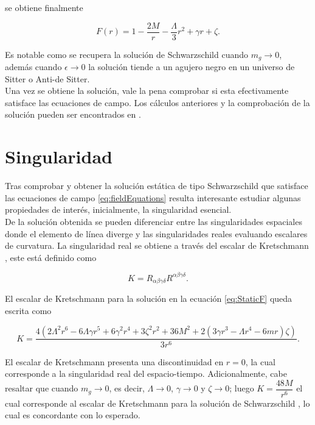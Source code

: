 se obtiene finalmente

\begin{equation}
    F(r)=1-\dfrac{2M}{r}-\dfrac{\Lambda}{3}r^2+\gamma r+\zeta.
    \label{eq:StaticF}
\end{equation}

Es notable como se recupera la solución de Schwarzschild cuando $m_g\rightarrow 0$, además cuando $\epsilon\rightarrow 0$ la solución tiende a un agujero negro en un universo de Sitter o Anti-de Sitter.\\

Una vez se obtiene la solución, vale la pena comprobar si esta efectivamente satisface las ecuaciones de campo. Los cálculos anteriores y la comprobación de la solución pueden ser encontrados en \cite{GitHub}.

\section{Singularidad}
Tras comprobar y obtener la solución estática de tipo Schwarzschild que satisface las ecuaciones de campo \eqref{eq:fieldEquations} resulta interesante estudiar algunas propiedades de interés, inicialmente, la singularidad esencial.\\

De la solución obtenida se pueden diferenciar entre las singularidades espaciales donde el elemento de línea diverge y las singularidades reales evaluando escalares de curvatura. La singularidad real se obtiene a través del escalar de Kretschmann \cite{EventHorizonsKerr}, este está definido como

\begin{equation}
    K=R_{\alpha\beta\gamma\delta}R^{\alpha\beta\gamma\delta}.
\end{equation}

El escalar de Kretschmann para la solución en la ecuación \eqref{eq:StaticF} queda escrita como

\begin{equation}
    K=\dfrac{4\left(2\Lambda^2r^6-6\Lambda\gamma r^5+6\gamma^2r^4+3\zeta^2r^2+36M^2+2\left(3\gamma r^3 -\Lambda r^4-6mr\right)\zeta\right)}{3r^6}.
\end{equation}

El escalar de Kretschmann presenta una discontinuidad en $r=0$, la cual corresponde a la singularidad real del espacio-tiempo. Adicionalmente, cabe resaltar que cuando $m_g\rightarrow0$, es decir, $\Lambda\rightarrow0$, $\gamma\rightarrow0$ y $\zeta\rightarrow0$; luego $K=\dfrac{48M}{r^6}$ el cual corresponde al escalar de Kretschmann para la solución de Schwarzschild \cite{BabmiBlackHoles}, lo cual es concordante con lo esperado.

